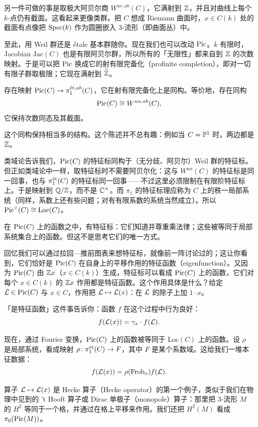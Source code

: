 另一件可做的事是取极大阿贝尔商 $W^{ur,ab}(C)$，它满射到 $\Z$，并且对曲线上每个 $k$-点仍有截面。这看起来更像类群。把 $C$ 想成 Riemann 曲面时，$x\in C(k)$ 处的截面有点像把 $\Spec(k)$ 作为圆圈嵌入 3-流形（即曲面丛）中。

至此，用 Weil 群还是 étale 基本群随你。现在我们也可以改动 $\Pic$。$k$ 有限时，Jacobian $\mathrm{Jac}(C)$ 也是有限阿贝尔群，所以所有的「无限性」都来自到 $\Z$ 的次数映射。于是可以把 $\Pic$ 换成它的射有限完备化（profinite completion），即对一切有限子群取极限；它现在满射到 $\widehat{\Z}$。


\begin{theorem}[无分歧类域论]
  存在映射 $\Pic(C)\to\pi_1^{\et,ab}(C)$，它在射有限完备化上是同构。等价地，存在同构
  \[
    \Pic(C)\cong W^{un,ab}(C),
  \]
  它保持次数同态及其截面。
\end{theorem}

这个同构保持相当多的结构。这个陈述并不总有趣：例如当 $C=\P^1$ 时，两边都是 $\Z$。

类域论告诉我们，$\Pic(C)$ 的特征标同构于（无分歧、阿贝尔）Weil 群的特征标。但正如类域论中一样，取特征标时不需要阿贝尔化：这与 $W^{un}(C)$ 的特征标是同一回事，也与 $\pi_1^{\et}(C)$ 的特征标同一回事——不过这里必须限制在有限阶特征标上。于是映射到 $\Q/\Z$，而不是 $\C^\times$。而 $\pi_1$ 的特征标理应称为 $C$ 上的秩一局部系统（同样，系数上还有些问题；对有有限系数的系统当然成立）。所以 $\Pic^\vee(C)\cong \mathrm{Loc}(C)$。

在 $\Pic(C)$ 上的函数之中，有特征标：它们知道并尊重乘法律；这些被等同于局部系统集合上的函数。但这不是思考它们的唯一方式。

回忆我们可以通过拉回—推前图表来想特征标，就像前一阵讨论过的；这让你看到，它们恰好是 $\Pic(C)$ 在自身上的平移作用的特征函数（eigenfunction）。又因为 $\Pic(C)$ 由 $\Z x$（$x\in C(k)$）生成，特征标可以看成 $\Pic(C)$ 上的函数，它们对每个 $x\in C(k)$ 的 $\Z x$ 作用都是特征函数。这个作用具体是什么？给定 $\cL\in\Pic(C)$ 与 $x\in C$，作用把 $\cL\mapsto\cL(x)$：在 $\cL$ 的除子上加 $1\cdot x$。

「是特征函数」这件事告诉你：函数 $f$ 在这个过程中行为良好：
\[
  f(\cL(x)) = \gamma_x\cdot f(\cL).
\]

现在，通过 Fourier 变换，$\Pic(C)$ 上的函数被等同于 $\mathrm{Loc}(C)$ 上的函数。设 $\rho$ 是局部系统，看成映射 $\rho\colon\pi_1^{\et}(C)\to F$，其中 $F$ 是某个系数域。这给我们一堆本征数据：
\[
  f(\cL(x)) = \rho(\Frob_x) f(\cL).
\]

算子 $\cL\mapsto\cL(x)$ 是 Hecke 算子（Hecke operator）的第一个例子，类似于我们在物理中见到的 't Hooft 算子或 Dirac 单极子（monopole）算子：那里把 3-流形 $M$ 的 $H^2$ 等同于一个格，并通过在格上平移来作用。我们还把 $H^2(M)$ 看成 $\pi_0(\Pic(M))$。

